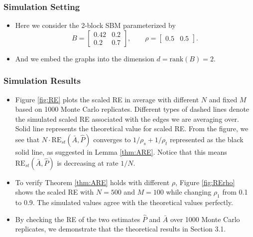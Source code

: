 \documentclass[a4paper]{article}
\begin{document}
\subsubsection{Simulation Setting}
\begin{itemize}
\item Here we consider the 2-block SBM parameterized by
\begin{equation*}
B = \begin{bmatrix}
0.42 & 0.2 \\
0.2 & 0.7
\end{bmatrix}
,\qquad \rho = \begin{bmatrix}
0.5 & 0.5
\end{bmatrix}.
\end{equation*}
\item And we embed the graphs into the dimension $d = \mathrm{rank}(B) = 2$.
\end{itemize}
\subsubsection{Simulation Results}
\begin{itemize}
\item Figure \ref{fig:RE} plots the scaled RE in average with different $N$ and fixed $M$ based on 1000 Monte Carlo replicates. Different types of dashed lines denote the simulated scaled RE associated with the edges we are averaging over. Solid line represents the theoretical value for scaled RE. From the figure, we see that $N \cdot \mathrm{RE}_{st}(\bar{A}, \hat{P})$ converges to $1/\rho_s + 1/\rho_t$ represented as the black solid line, as suggested in Lemma \ref{thm:ARE}. Notice that this means $\mathrm{RE}_{st}(\bar{A}, \hat{P})$ is decreasing at rate $1/N$.
\item To verify Theorem \ref{thm:ARE} holds with different $\rho$, Figure \ref{fig:RErho} shows the scaled RE with $N = 500$ and $M = 100$ while changing $\rho_1$ from 0.1 to 0.9. The simulated values agree with the theoretical values perfectly.
\item By checking the RE of the two estimates $\hat{P}$ and $\bar{A}$ over 1000 Monte Carlo replicates, we demonstrate that the theoretical results in Section 3.1.
\end{itemize}
\end{document}
